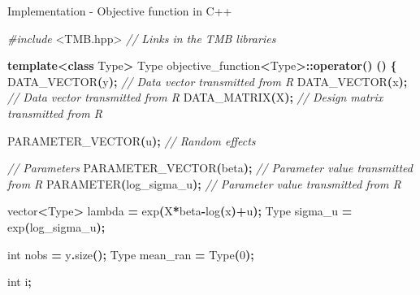 \documentclass[aspectratio=169]{beamer}
\newenvironment{Shaded}{\begin{snugshade}}{\end{snugshade}}
\newcommand{\CommentTok}[1]{\textcolor[rgb]{0.56,0.35,0.01}{\textit{#1}}}
\newcommand{\DataTypeTok}[1]{\textcolor[rgb]{0.13,0.29,0.53}{#1}}
\newcommand{\DecValTok}[1]{\textcolor[rgb]{0.00,0.00,0.81}{#1}}
\newcommand{\ImportTok}[1]{#1}
\newcommand{\KeywordTok}[1]{\textcolor[rgb]{0.13,0.29,0.53}{\textbf{#1}}}
\newcommand{\NormalTok}[1]{#1}
\newcommand{\OperatorTok}[1]{\textcolor[rgb]{0.81,0.36,0.00}{\textbf{#1}}}
\newcommand{\PreprocessorTok}[1]{\textcolor[rgb]{0.56,0.35,0.01}{\textit{#1}}}
\begin{document}
\begin{frame}[fragile]{Implementation - Objective function in C++}
\protect\hypertarget{implementation---objective-function-in-c}{}
\tiny

\begin{Shaded}
\begin{Highlighting}[]
\PreprocessorTok{\#include }\ImportTok{\textless{}TMB.hpp\textgreater{}}\PreprocessorTok{              }\CommentTok{// Links in the TMB libraries}

\KeywordTok{template}\OperatorTok{\textless{}}\KeywordTok{class}\NormalTok{ Type}\OperatorTok{\textgreater{}}
\NormalTok{Type objective\_function}\OperatorTok{\textless{}}\NormalTok{Type}\OperatorTok{\textgreater{}::}\KeywordTok{operator}\OperatorTok{()} \OperatorTok{()}
\OperatorTok{\{}
\NormalTok{  DATA\_VECTOR}\OperatorTok{(}\NormalTok{y}\OperatorTok{);}                               \CommentTok{// Data vector transmitted from R}
\NormalTok{  DATA\_VECTOR}\OperatorTok{(}\NormalTok{x}\OperatorTok{);}                       \CommentTok{// Data vector transmitted from R}
\NormalTok{  DATA\_MATRIX}\OperatorTok{(}\NormalTok{X}\OperatorTok{);}                       \CommentTok{// Design matrix transmitted from R}
  
\NormalTok{  PARAMETER\_VECTOR}\OperatorTok{(}\NormalTok{u}\OperatorTok{);}                      \CommentTok{// Random effects}
  
  \CommentTok{// Parameters}
\NormalTok{  PARAMETER\_VECTOR}\OperatorTok{(}\NormalTok{beta}\OperatorTok{);}         \CommentTok{// Parameter value transmitted from R}
\NormalTok{  PARAMETER}\OperatorTok{(}\NormalTok{log\_sigma\_u}\OperatorTok{);}               \CommentTok{// Parameter value transmitted from R}
  
\NormalTok{  vector}\OperatorTok{\textless{}}\NormalTok{Type}\OperatorTok{\textgreater{}}\NormalTok{ lambda  }\OperatorTok{=}\NormalTok{ exp}\OperatorTok{(}\NormalTok{X}\OperatorTok{*}\NormalTok{beta}\OperatorTok{{-}}\NormalTok{log}\OperatorTok{(}\NormalTok{x}\OperatorTok{)+}\NormalTok{u}\OperatorTok{);}
\NormalTok{  Type sigma\_u }\OperatorTok{=}\NormalTok{ exp}\OperatorTok{(}\NormalTok{log\_sigma\_u}\OperatorTok{);}
  
  \DataTypeTok{int}\NormalTok{ nobs }\OperatorTok{=}\NormalTok{ y}\OperatorTok{.}\NormalTok{size}\OperatorTok{();}
\NormalTok{  Type mean\_ran }\OperatorTok{=}\NormalTok{ Type}\OperatorTok{(}\DecValTok{0}\OperatorTok{);}
  
  \DataTypeTok{int}\NormalTok{ i}\OperatorTok{;}
  

\end{Highlighting}
\end{Shaded}
\end{frame}
\end{document}
